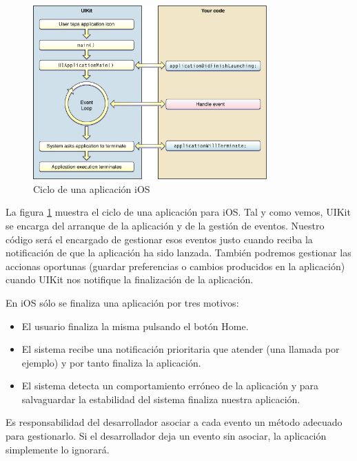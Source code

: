  \begin{figure} [h]
  \centering
    \includegraphics[width=0.8\textwidth]{./images/app_life_cycle.jpg}
  \caption{Ciclo de una aplicación iOS }
  \label{fig:iOS-layers}
\end{figure}
     
   La figura \ref{fig:iOS-layers} %
    muestra el ciclo de una aplicación para iOS. Tal y como vemos, UIKit se encarga del arranque de la aplicación y de la gestión de eventos. Nuestro código será el encargado de gestionar esos eventos justo cuando reciba la notificación de que la aplicación ha sido lanzada. También podremos gestionar las accionas oportunas (guardar preferencias o cambios producidos en la aplicación) cuando UIKit nos notifique la finalización de la aplicación.
   
    En iOS sólo se finaliza una aplicación por tres motivos:
    \begin{itemize}
	\item El usuario finaliza la misma pulsando el botón \textsf{Home}. %
	\item El sistema recibe una notificación prioritaria que atender (una llamada por ejemplo) y por tanto finaliza la aplicación. %
	\item El sistema detecta un comportamiento erróneo de la aplicación y para salvaguardar la estabilidad del sistema finaliza nuestra aplicación.
     \end{itemize}

    Es responsabilidad del desarrollador asociar a cada evento un método adecuado para gestionarlo. Si el desarrollador deja un evento sin asociar, la aplicación simplemente lo ignorará.
    
